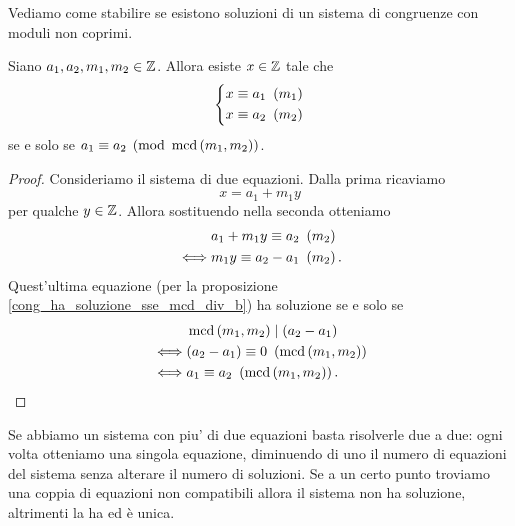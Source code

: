 Vediamo come stabilire se esistono soluzioni di un sistema di congruenze con moduli non coprimi.

\begin{proposition}
    Siano $a_1, a_2, m_1, m_2 \in \mathbb{Z}$. Allora esiste $x \in \mathbb{Z}$ tale che 
    \begin{equation*}
        \left\{
        \begin{alignedat}{1}
            x&\equiv a_1 \ \left(m_1\right)\\
            x&\equiv a_2 \ \left(m_2\right)
        \end{alignedat}      
        \right . 
    \end{equation*}
    se e solo se $a_1 \equiv a_2 \pmod{\operatorname{mcd}\left(m_1, m_2\right)}$.
\end{proposition}
\begin{proof}
    Consideriamo il sistema di due equazioni. Dalla prima ricaviamo \[
        x = a_1 + m_1y    
    \] per qualche $y \in \mathbb{Z}$. Allora sostituendo nella seconda otteniamo \begin{alignat*}
        {1}
        &a_1+m_1y \equiv a_2 \ \left(m_2\right)\\
        \iff &m_1y \equiv a_2 - a_1 \ \left(m_2\right).
    \end{alignat*}
    Quest'ultima equazione (per la proposizione \ref{cong_ha_soluzione_sse_mcd_div_b}) ha soluzione se e solo se 
    \begin{alignat*}
        {1}
        &\operatorname{mcd}\left(m_1, m_2\right) \mid (a_2-a_1) \\
        \iff &(a_2-a_1) \equiv 0 \ \left(\operatorname{mcd}\left(m_1, m_2\right)\right) \\
        \iff &a_1 \equiv a_2 \ \left(\operatorname{mcd}\left(m_1, m_2\right)\right). \tag*{\qedhere}
    \end{alignat*}
\end{proof}

Se abbiamo un sistema con piu' di due equazioni basta risolverle due a due: ogni volta otteniamo una singola equazione, diminuendo di uno il numero di equazioni del sistema senza alterare il numero di soluzioni. Se a un certo punto troviamo una coppia di equazioni non compatibili allora il sistema non ha soluzione, altrimenti la ha ed è unica.

